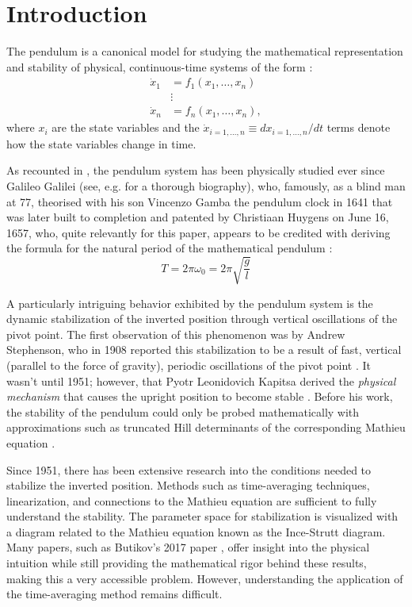 \documentclass[12pt, letterpaper]{article}
\begin{document}
\section{Introduction}
The pendulum is a canonical model for studying the mathematical representation and stability of physical, continuous-time systems of the form \cite{strogatz2018nonlinear}:
\begin{align}
    \dot{x}_1 &= f_1\left(x_1, \ldots, x_n\right) \nonumber \\ 
    &\vdots \nonumber \\ 
    \dot{x}_n &= f_n\left(x_1, \ldots, x_n\right) \label{eq:general_system_framework},
\end{align}
where $x_i$ are the state variables and the $\dot{x}_{i=1,\ldots,n} \equiv d{x}_{i=1,\ldots,n}/dt$ terms denote how the state variables change in time. 
\par As recounted in \cite{dolan2017inverted}, the pendulum system has been physically studied ever since Galileo Galilei (see, e.g. \cite{drake2003galileo} for a thorough biography), who, famously, as a blind man at 77, theorised with his son Vincenzo Gamba the pendulum clock in 1641 that was later built to completion and patented by Christiaan Huygens on June 16, 1657, who, quite relevantly for this paper, appears to be credited with deriving the formula for the natural period of the mathematical pendulum \cite{aps_huygens_2017}:
\begin{equation}
    T = 2\pi \omega_0 = 2\pi\sqrt{\dfrac{g}{l}} \label{eq:natural_period_math_pendulum}
\end{equation}

\par A particularly intriguing behavior exhibited by the pendulum system is the dynamic stabilization of the inverted position through vertical oscillations of the pivot point. The first observation of this phenomenon was by Andrew Stephenson, who in 1908 reported this stabilization to be a result of fast, vertical (parallel to the force of gravity), periodic oscillations of the pivot point \cite{Stephenson1908XXOI}. It wasn't until 1951; however, that Pyotr Leonidovich Kapitsa derived the \emph{physical mechanism} that causes the upright position to become stable \cite{kapitsa1951jetp}. Before his work, the stability of the pendulum could only be probed mathematically with approximations such as truncated Hill determinants of the corresponding Mathieu equation \cite{kapitsa1951jetp}.

\par Since 1951, there has been extensive research into the conditions needed to stabilize the inverted position. Methods such as time-averaging techniques, linearization, and connections to the Mathieu equation are sufficient to fully understand the stability. The parameter space for stabilization is visualized with a diagram related to the Mathieu equation known as the Ince-Strutt diagram. Many papers, such as Butikov's 2017 paper \cite{Butikov2017KapitzaS}, offer insight into the physical intuition while still providing the mathematical rigor behind these results, making this a very accessible problem. However, understanding the application of the time-averaging method remains difficult. 
\end{document}
